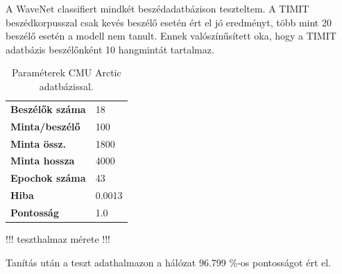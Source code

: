 A WaveNet classifiert mindkét beszédadatbázison teszteltem. A TIMIT beszédkorpusszal csak kevés beszélő esetén ért el jó eredményt, több mint 20 beszélő esetén a modell nem tanult. Ennek valószínűsített oka, hogy a TIMIT adatbázis beszélőnként 10 hangmintát tartalmaz.

\setlength\arrayrulewidth{0.6pt}

\begin{table}[!ht]
	\begin{tabular}{l|l} \toprule
		\bfseries Beszélők száma & 18 \\
		\rowcolor{gray!10}
		\bfseries Minta/beszélő & 100\\
		\bfseries Minta össz. & 1800 \\
		\rowcolor{gray!10}
		\bfseries Minta hossza & 4000 \\
		\bfseries Epochok száma & 43\\
		\rowcolor{gray!10}
		\bfseries Hiba & 0.0013 \\ 
		\bfseries Pontosság & 1.0 \\ 
		\bottomrule
		\hline
	\end{tabular}
	\centering
	\caption{Paraméterek CMU Arctic adatbázissal.}
	\label{fig:wavenet-arctic}
\end{table}

!!! teszthalmaz mérete !!!

Tanítás után a teszt adathalmazon a hálózat 96.799 \%-os pontosságot ért el.
\newline
\newline

